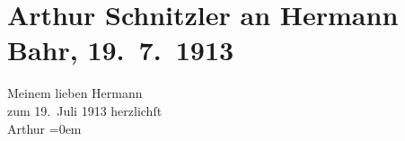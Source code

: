 

         
         \newcommand{\erwaehntePersonen}{Personen: Hermann Bahr, Emma Löwenstamm}
         \newcommand{\erwaehnteOrte}{Orte: Salzburg, Wien}
         \newcommand{\erwaehnteWerke}{Werke: Arthur Schnitzler }
               \section[Arthur Schnitzler an Hermann Bahr, 19. 7. 1913]{ Arthur Schnitzler an Hermann Bahr, 19. 7. 1913}\nopagebreak{}\rehead{ }\begin{ledgroupsized}[t]{13cm}\normalsize\beginnumbering \toendnotes[C]{\smallbreak\pagebreak[2]} 
\pstart
           \noindent{}{\pb}Meinem lieben
               Hermann{\\}zum 19. Juli 1913\pend
           \pstart
           herzlichſt{\\[\baselineskip]}\spacefill\mbox{Arthur}\pend
           \leftskip=0em{}
         
         \endnumbering{}\end{ledgroupsized}  \newcommand{\dateiname}{L02142}\newcommand{\titel}{Arthur Schnitzler an Hermann Bahr, 19. 7. 1913}\newcommand{\editorInnen}{ Kurt Ifkovits,  Martin Anton Müller}
      